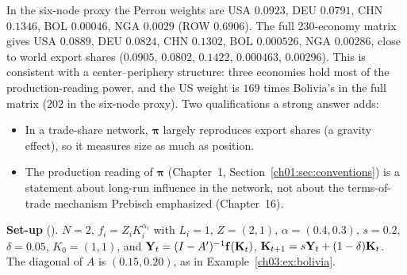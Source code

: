 \documentclass[../solutions_manual.tex]{subfiles}
\begin{document}
 In the six-node proxy the Perron weights are USA $0.0923$, DEU $0.0791$, CHN $0.1346$, BOL $0.00046$, NGA $0.0029$ (ROW $0.6906$). The full 230-economy matrix gives USA $0.0889$, DEU $0.0824$, CHN $0.1302$, BOL $0.000526$, NGA $0.00286$, close to world export shares ($0.0905$, $0.0802$, $0.1422$, $0.000463$, $0.00296$). This is consistent with a center--periphery structure: three economies hold most of the production-reading power, and the US weight is $169$ times Bolivia's in the full matrix ($202$ in the six-node proxy). Two qualifications a strong answer adds:
\begin{itemize}
\item In a trade-share network, $\boldsymbol\pi$ largely reproduces export shares (a gravity effect), so it measures size as much as position.
\item The production reading of $\boldsymbol\pi$ (Chapter~1, Section~\ref{ch01:sec:conventions}) is a statement about long-run influence in the network, not about the terms-of-trade mechanism Prebisch emphasized (Chapter~16).
\end{itemize}


\textbf{Set-up} (\illustrative). $N = 2$, $f_i = Z_iK_i^{\alpha_i}$ with $L_i = 1$, $Z = (2, 1)$, $\alpha = (0.4, 0.3)$, $s = 0.2$, $\delta = 0.05$, $K_0 = (1,1)$, and $\mathbf Y_t = (I - A')^{-1}\mathbf f(\mathbf{K}_t)$, $\mathbf{K}_{t+1} = s\mathbf Y_t + (1-\delta)\mathbf{K}_t$. The diagonal of $A$ is $(0.15, 0.20)$, as in Example~\ref{ch03:ex:bolivia}.
\end{document}
